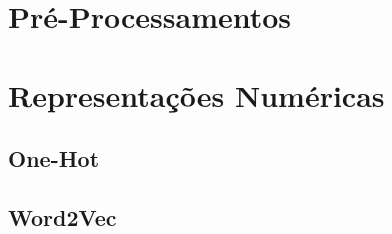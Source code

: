 \section{Pré-Processamentos}

\section{Representações Numéricas}

\subsection{One-Hot}

\subsection{Word2Vec}
